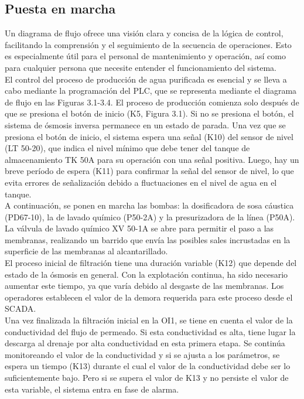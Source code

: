 \subsection{Puesta en marcha}

Un diagrama de flujo ofrece una visión clara y concisa de la lógica de control,
facilitando la comprensión y el seguimiento de la secuencia de operaciones.
Esto es especialmente útil para el personal de mantenimiento y operación,
así como para cualquier persona que necesite entender el funcionamiento del sistema.\\

El control del proceso de producción de agua purificada es esencial y se
lleva a cabo mediante la programación del PLC, que se representa mediante
el diagrama de flujo en las Figuras 3.1-3.4. El proceso de producción
comienza solo después de que se presiona el botón de inicio (K5, Figura 3.1).
Si no se presiona el botón, el sistema de ósmosis inversa permanece en un
estado de parada. Una vez que se presiona el botón de inicio, el sistema
espera una señal (K10) del sensor de nivel (LT 50-20), que indica el nivel mínimo que debe tener
del tanque de almacenamiento TK 50A para su operación con una señal positiva. Luego, hay un breve período de espera
(K11) para confirmar la señal del sensor de nivel, lo que evita errores de señalización
debido a fluctuaciones en el nivel de agua en el tanque.\\


A continuación, se ponen en marcha las bombas: la dosificadora de sosa cáustica
(PD67-10), la de lavado químico (P50-2A) y la presurizadora de la línea (P50A).
La válvula de lavado químico XV 50-1A se abre para permitir el paso a las membranas,
realizando un barrido que envía las posibles sales incrustadas en la superficie de las
membranas al alcantarillado.\\

El proceso inicial de filtración tiene una duración variable (K12) que depende del
estado de la ósmosis en general. Con la explotación continua, ha sido necesario
aumentar este tiempo, ya que varía debido al desgaste de las membranas.
Los operadores establecen el valor de la demora requerida para este proceso desde el SCADA.\\

Una vez finalizada la filtración inicial en la OI1, se tiene en cuenta el valor de la
conductividad del flujo de permeado. Si esta conductividad es alta, tiene lugar
la descarga al drenaje por alta conductividad en esta primera etapa. Se continúa monitoreando
el valor de la conductividad y si se ajusta a los parámetros, se espera un tiempo
(K13) durante el cual el valor de la conductividad debe ser lo suficientemente bajo.
Pero si se supera el valor de K13 y no persiste el valor de esta variable, el sistema
entra en fase de alarma.\\

